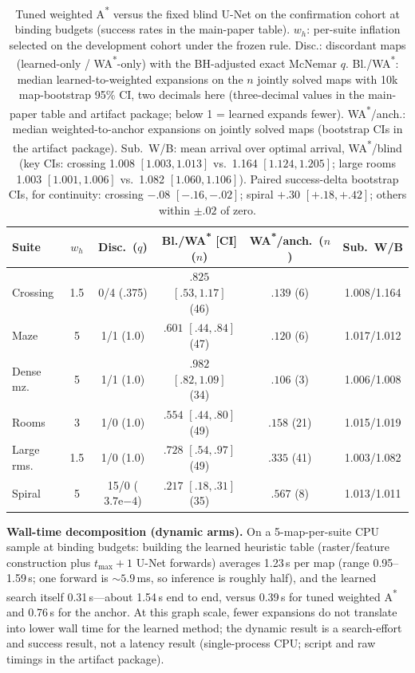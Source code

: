 \documentclass[letterpaper]{article} %
\begin{document}
\begin{table}[t]
\centering
\small
\setlength{\tabcolsep}{1.3pt}
\begin{tabular}{@{}lccccc@{}}
\toprule
Suite & $w_h$ & Disc.\ ($q$) & Bl./WA\textsuperscript{*} [CI] ($n$) & WA\textsuperscript{*}/anch.\ ($n$) & Sub.\ W/B \\
\midrule
Crossing & 1.5 & 0/4 (.375) & $.825$ $[.53,1.17]$ (46) & $.139$ (6) & 1.008/1.164 \\
Maze & 5 & 1/1 (1.0) & $.601$ $[.44,.84]$ (47) & $.120$ (6) & 1.017/1.012 \\
Dense mz. & 5 & 1/1 (1.0) & $.982$ $[.82,1.09]$ (34) & $.106$ (3) & 1.006/1.008 \\
Rooms & 3 & 1/0 (1.0) & $.554$ $[.44,.80]$ (49) & $.158$ (21) & 1.015/1.019 \\
Large rms. & 1.5 & 1/0 (1.0) & $.728$ $[.54,.97]$ (49) & $.335$ (41) & 1.003/1.082 \\
Spiral & 5 & 15/0 ($3.7\mathrm{e}{-4}$) & $.217$ $[.18,.31]$ (35) & $.567$ (8) & 1.013/1.011 \\
\bottomrule
\end{tabular}
\caption{Tuned weighted A\textsuperscript{*} versus the fixed blind U-Net on the confirmation cohort at binding budgets (success rates in the main-paper table). $w_h$: per-suite inflation selected on the development cohort under the frozen rule. Disc.: discordant maps (learned-only / WA\textsuperscript{*}-only) with the BH-adjusted exact McNemar $q$. Bl./WA\textsuperscript{*}: median learned-to-weighted expansions on the $n$ jointly solved maps with 10k map-bootstrap 95\% CI, two decimals here (three-decimal values in the main-paper table and artifact package; below 1 = learned expands fewer). WA\textsuperscript{*}/anch.: median weighted-to-anchor expansions on jointly solved maps (bootstrap CIs in the artifact package). Sub.\ W/B: mean arrival over optimal arrival, WA\textsuperscript{*}/blind (key CIs: crossing 1.008 $[1.003,1.013]$ vs.\ 1.164 $[1.124,1.205]$; large rooms 1.003 $[1.001,1.006]$ vs.\ 1.082 $[1.060,1.106]$). Paired success-delta bootstrap CIs, for continuity: crossing $-.08$ $[-.16,-.02]$; spiral $+.30$ $[+.18,+.42]$; others within $\pm.02$ of zero.}
\label{tab:wastar}
\end{table}

\textbf{Wall-time decomposition (dynamic arms).} On a 5-map-per-suite CPU sample at binding budgets: building the learned heuristic table (raster/feature construction plus $t_{\max}{+}1$ U-Net forwards) averages 1.23\,s per map (range 0.95--1.59\,s; one forward is ${\sim}5.9$\,ms, so inference is roughly half), and the learned search itself 0.31\,s---about 1.54\,s end to end, versus 0.39\,s for tuned weighted A\textsuperscript{*} and 0.76\,s for the anchor. At this graph scale, fewer expansions do not translate into lower wall time for the learned method; the dynamic result is a search-effort and success result, not a latency result (single-process CPU; script and raw timings in the artifact package).
\end{document}
